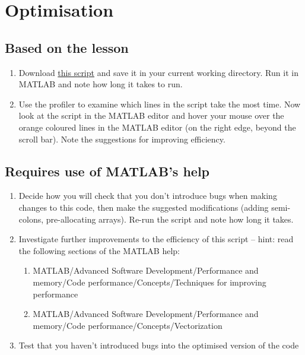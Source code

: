 \documentclass{article}
\begin{document}
	\section{Optimisation}
		\subsection*{Based on the lesson}
			\begin{enumerate}
				\item Download \href{https://github.com/UoMResearchIT/MATLAB-online-exercises/raw/master/lesson6_mfiles/loopy.m}{this script} and save it in your current working directory. Run it in MATLAB and note how long it takes to run. 
				
				\item Use the profiler to examine which lines in the script take the most time. Now look at the script in the MATLAB editor and hover your mouse over the orange coloured lines in the MATLAB editor (on the right edge, beyond the scroll bar). Note the suggestions for improving efficiency.
			\end{enumerate}	
		
		\subsection*{Requires use of MATLAB's help}
		\begin{enumerate}[resume]
			\item Decide how you will check that you don't introduce bugs when making changes to this code, then make the suggested modifications (adding semi-colons, pre-allocating arrays). Re-run the script and note how long it takes.
			\item Investigate further improvements to the efficiency of this script -- hint: read the following sections of the MATLAB help:
			\begin{enumerate}
				\item MATLAB/Advanced Software Development/Performance and memory/Code performance/Concepts/Techniques for improving performance
				\item MATLAB/Advanced Software Development/Performance and memory/Code performance/Concepts/Vectorization
			\end{enumerate}
			\item Test that you haven't introduced bugs into the optimised version of the code
		\end{enumerate}
\end{document}
